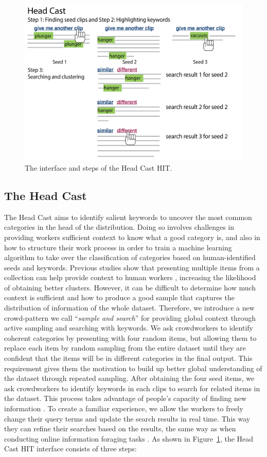 \begin{figure}
	\centering
	\includegraphics[width=0.6\columnwidth]{Chapters/Alloy/images/clusteringv2-04.png}
	\caption{The interface and steps of the Head Cast HIT.}
	\label{fig:phase1-hit}
\end{figure}

\subsection{The Head Cast}
The Head Cast aims to identify salient keywords to uncover the most common
categories in the head of the distribution. Doing so involves challenges in
providing workers sufficient context to know what a good category is, and also
in how to structure their work process in order to train a machine learning
algorithm to take over the classification of categories based on
human-identified seeds and keywords. 
Previous studies show that presenting multiple items from a collection can help
provide context to human workers \cite{medlin1978}, increasing the likelihood
of obtaining better clusters.  However, it can be difficult to determine how
much context is sufficient and how to produce a good sample that captures the
distribution of information of the whole dataset. 
Therefore, we introduce a new crowd-pattern we call ``\emph{sample and
    search}'' for providing global context through active sampling and
searching with keywords.   We ask crowdworkers to identify coherent categories
by presenting with four random items, but allowing them to replace each item by
random sampling from the entire dataset until they are confident that the items
will be in different categories in the final output.  This requirement gives them
the motivation to build up better global understanding of the dataset through
repeated sampling. After obtaining the four seed items, we ask crowdworkers to
identify keywords in each clips to search for related items in the dataset.
This process takes advantage of people's capacity of finding new information
\cite{pirolli1999information}. To create a familiar experience, we allow the
workers to freely change their query terms and update the search results in real
time. This way they can refine their searches based on the results, the same
way as when conducting online information foraging tasks \cite{jansen2009patterns}.
As shown in Figure~\ref{fig:phase1-hit}, the Head Cast HIT interface consists of three steps:

